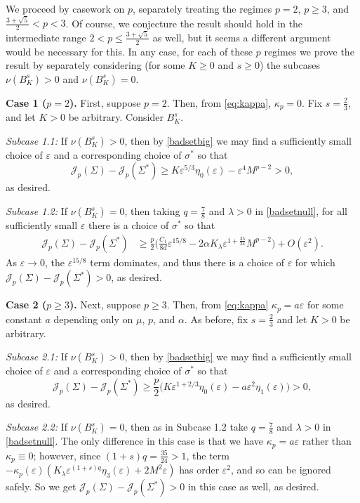 \documentclass[preprint, reqno]{amsart}
\renewcommand{\epsilon}{\varepsilon}
\theoremstyle{definition}
\numberwithin{equation}{section}
\begin{document}
We proceed by casework on $p$, separately treating the regimes $p=2$,
$p \geq 3$, and $\frac{3 + \sqrt 5}{2} < p < 3$. Of course, we
conjecture the result should hold in the intermediate range $2 < p
\leq \frac{3 + \sqrt 5}{2}$ as well, but it seems a different argument
would be necessary for this. In any case, for each of these $p$
regimes we prove the result by separately considering (for some $K
\geq 0$ and $s \geq 0$) the subcases $\nu(B_K^s) > 0$ and $\nu(B_K^s)
= 0$.


\medskip

\textbf{Case 1 ($p=2$).} First, suppose $p = 2$. Then, from
\eqref{eq:kappa}, $\kappa_p = 0$. Fix $s = \frac{2}{3}$, and let $K >
0$ be arbitrary. Consider $B_{K}^s$.

\emph{Subcase 1.1:} If $\nu(B_K^s) >0$, then by \cref{badsetbig}
we may find a sufficiently small choice of $\epsilon$ and a
corresponding choice of $\sigma^*$ so that
\[
  \mathscr{J}_p(\Sigma) - \mathscr{J}_p(\Sigma^*) \geq K
  \epsilon^{5/3}\eta_0(\epsilon) - \epsilon^4 M^{p-2} > 0,
\]
as desired.

\emph{Subcase 1.2:} If $\nu(B_K^s) = 0$, then taking $q =
\frac{7}{8}$ and $\lambda> 0$ in \cref{badsetnull}, for all
sufficiently small $\epsilon$ there is a choice of $\sigma^*$ so that
\begin{align*}
  \mathscr{J}_p(\Sigma) - \mathscr{J}_p(\Sigma^*)
  & \ge \frac{p}{2} \Big(\frac{C_1}{8d} \epsilon^{15/8} -
    2\alpha K_{\lambda} \epsilon^{1+\frac{35}{24}} M^{p-2}
    \Big) +O(\epsilon^2).
\end{align*}
As $\epsilon \to 0$, the $\epsilon^{15/8}$ term dominates, and thus
there is a choice of $\epsilon$ for which $\mathscr{J}_p(\Sigma) -
\mathscr{J}_p(\Sigma^*) > 0$, as desired.

\medskip

\textbf{Case 2 ($p \ge 3$).} Next, suppose $p \geq 3$. Then, from
\eqref{eq:kappa} $\kappa_p = a\epsilon$ for some constant $a$
depending only on $\mu$, $p$, and $\alpha$. As before, fix $s =
\frac{2}{3}$ and let $K > 0$ be arbitrary.

\emph{Subcase 2.1:} If $\nu(B_K^s) >0$, then by \cref{badsetbig}
we may find a sufficiently small choice of $\epsilon$ and a
corresponding choice of $\sigma^*$ so that
\[
  \mathscr{J}_p(\Sigma) - \mathscr{J}_p(\Sigma^*) \geq \frac{p}{2}
  \Big( K \epsilon^{1+2/3}\eta_0(\epsilon) - a\epsilon^2
  \eta_1(\epsilon) \Big)> 0,
\]
as desired.

\emph{Subcase 2.2:} If $\nu(B_K^s) = 0$, then as in Subcase 1.2 take
$q = \frac{7}{8}$ and $\lambda > 0$ in \cref{badsetnull}. The only
difference in this case is that we have $\kappa_p = a \epsilon$ rather
than $\kappa_p \equiv 0$; however, since $(1+s)q = \frac{35}{24} > 1$,
the term $-\kappa_p(\epsilon)(K_{\lambda}\epsilon^{(1 +
  s)q}\eta_3(\epsilon) + 2 M^2 \epsilon)$ has order $\epsilon^2$, and
so can be ignored safely. So we get $\mathscr J_p(\Sigma) - \mathscr
J_p(\Sigma^*) > 0$ in this case as well, as desired.
\end{document}
